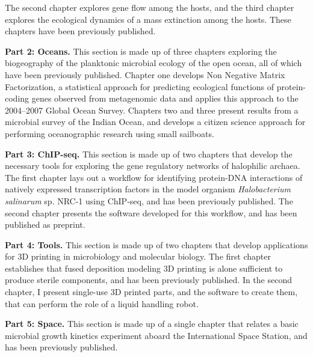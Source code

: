 The second chapter explores gene flow among the hosts, \cite{mcgee2016evaluating} and the third chapter explores the ecological dynamics of a mass extinction among the hosts. \cite{mcgee2015pharyngeal} These chapters have been previously published. 

\noindent\textbf{Part 2: Oceans.}
This section is made up of three chapters exploring the biogeography of the planktonic microbial ecology of the open ocean, all of which have been previously published. Chapter one develops Non Negative Matrix Factorization, a statistical approach for predicting ecological functions of protein-coding genes observed from metagenomic data and applies this approach to the 2004--2007 Global Ocean Survey. \cite{jiang2012functional} Chapters two and three present results from a microbial survey of the Indian Ocean, and develops a citizen science approach for performing oceanographic research using small sailboats. \cite{jeffries2015spatially, lauro2014common}

\noindent\textbf{Part 3: ChIP-seq.}
This section is made up of two chapters that develop the necessary tools for exploring the gene regulatory networks of halophilic archaea. The first chapter lays out a workflow for identifying protein-DNA interactions of natively expressed transcription factors in the model organism {\em Halobacterium salinarum} sp. NRC-1 using ChIP-seq, and has been previously published. \cite{wilbanks2012workflow} The second chapter presents the software developed for this workflow, and has been published as preprint. \cite{neches2014fit}

\noindent\textbf{Part 4: Tools.}
This section is made up of two chapters that develop applications for 3D printing in microbiology and molecular biology. The first chapter establishes that fused deposition modeling 3D printing is alone sufficient to produce sterile components, and has been previously published. \cite{neches2016intrinsic} In the second chapter, I present single-use 3D printed parts, and the software to create them, that can perform the role of a liquid handling robot.

\noindent\textbf{Part 5: Space.}
This section is made up of a single chapter that relates a basic microbial growth kinetics experiment aboard the International Space Station, and has been previously published. \cite{coil2016growth}

\printbibliography[heading=subbibliography]